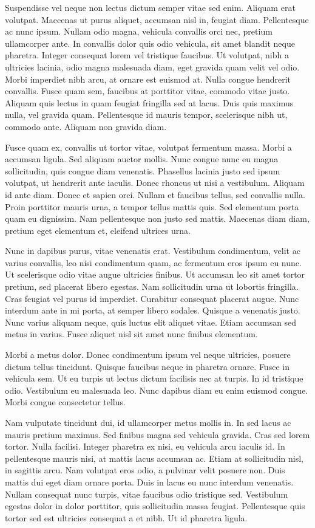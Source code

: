 \documentclass{homework}
\begin{document}
Suspendisse vel neque non lectus dictum semper vitae sed enim. Aliquam erat volutpat. Maecenas ut purus aliquet, accumsan nisl in, feugiat diam. Pellentesque ac nunc ipsum. Nullam odio magna, vehicula convallis orci nec, pretium ullamcorper ante. In convallis dolor quis odio vehicula, sit amet blandit neque pharetra. Integer consequat lorem vel tristique faucibus. Ut volutpat, nibh a ultricies lacinia, odio magna malesuada diam, eget gravida quam velit vel odio. Morbi imperdiet nibh arcu, at ornare est euismod at. Nulla congue hendrerit convallis. Fusce quam sem, faucibus at porttitor vitae, commodo vitae justo. Aliquam quis lectus in quam feugiat fringilla sed at lacus. Duis quis maximus nulla, vel gravida quam. Pellentesque id mauris tempor, scelerisque nibh ut, commodo ante. Aliquam non gravida diam.

Fusce quam ex, convallis ut tortor vitae, volutpat fermentum massa. Morbi a accumsan ligula. Sed aliquam auctor mollis. Nunc congue nunc eu magna sollicitudin, quis congue diam venenatis. Phasellus lacinia justo sed ipsum volutpat, ut hendrerit ante iaculis. Donec rhoncus ut nisi a vestibulum. Aliquam id ante diam. Donec et sapien orci. Nullam et faucibus tellus, sed convallis nulla. Proin porttitor mauris urna, a tempor tellus mattis quis. Sed elementum porta quam eu dignissim. Nam pellentesque non justo sed mattis. Maecenas diam diam, pretium eget elementum et, eleifend ultrices urna.

Nunc in dapibus purus, vitae venenatis erat. Vestibulum condimentum, velit ac varius convallis, leo nisi condimentum quam, ac fermentum eros ipsum eu nunc. Ut scelerisque odio vitae augue ultricies finibus. Ut accumsan leo sit amet tortor pretium, sed placerat libero egestas. Nam sollicitudin urna ut lobortis fringilla. Cras feugiat vel purus id imperdiet. Curabitur consequat placerat augue. Nunc interdum ante in mi porta, at semper libero sodales. Quisque a venenatis justo. Nunc varius aliquam neque, quis luctus elit aliquet vitae. Etiam accumsan sed metus in varius. Fusce aliquet nisl sit amet nunc finibus elementum.

Morbi a metus dolor. Donec condimentum ipsum vel neque ultricies, posuere dictum tellus tincidunt. Quisque faucibus neque in pharetra ornare. Fusce in vehicula sem. Ut eu turpis ut lectus dictum facilisis nec at turpis. In id tristique odio. Vestibulum eu malesuada leo. Nunc dapibus diam eu enim euismod congue. Morbi congue consectetur tellus.

Nam vulputate tincidunt dui, id ullamcorper metus mollis in. In sed lacus ac mauris pretium maximus. Sed finibus magna sed vehicula gravida. Cras sed lorem tortor. Nulla facilisi. Integer pharetra ex nisi, eu vehicula arcu iaculis id. In pellentesque mauris nisi, at mattis lacus accumsan ac. Etiam at sollicitudin nisl, in sagittis arcu. Nam volutpat eros odio, a pulvinar velit posuere non. Duis mattis dui eget diam ornare porta. Duis in lacus eu nunc interdum venenatis. Nullam consequat nunc turpis, vitae faucibus odio tristique sed. Vestibulum egestas dolor in dolor porttitor, quis sollicitudin massa feugiat. Pellentesque quis tortor sed est ultricies consequat a et nibh. Ut id pharetra ligula.
\end{document}
